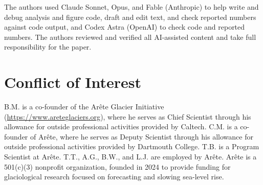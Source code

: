 \documentclass[draft,linenumbers]{agujournal2025}
\begin{document}
The authors used Claude Sonnet, Opus, and Fable (Anthropic) to help write and debug analysis and figure code, draft and edit text, and check reported numbers against code output, and Codex Astra (OpenAI) to check code and reported numbers. The authors reviewed and verified all AI-assisted content and take full responsibility for the paper.

\section*{Conflict of Interest}
B.M. is a co-founder of the Ar\^ete Glacier Initiative (\url{https://www.areteglaciers.org}), where he serves as Chief Scientist through his allowance for outside professional activities provided by Caltech. C.M. is a co-founder of Ar\^ete, where he serves as Deputy Scientist through his allowance for outside professional activities provided by Dartmouth College. T.B. is a Program Scientist at Ar\^ete. T.T., A.G., B.W., and L.J. are employed by Ar\^ete. Ar\^ete is a 501(c)(3) nonprofit organization, founded in 2024 to provide funding for glaciological research focused on forecasting and slowing sea-level rise.


\end{document}
